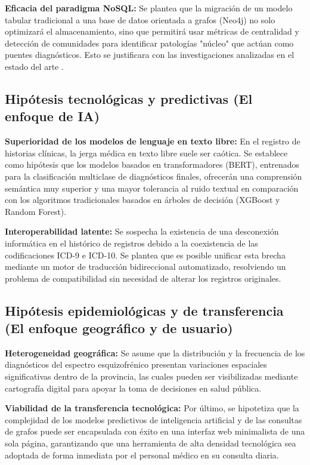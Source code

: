 \documentclass[12pt,a4paper,onecolumn,oneside]{report}
\begin{document}
    \textbf{Eficacia del paradigma NoSQL:} Se plantea que la migración de un modelo tabular tradicional a una base de datos orientada a grafos (Neo4j) no solo optimizará el almacenamiento, sino que permitirá usar métricas de centralidad y detección de comunidades para identificar patologías "núcleo" que actúan como puentes diagnósticos. Esto se justificara con las investigaciones analizadas en el estado del arte \cite{hidalgo2009dynamic}.

\subsection{Hipótesis tecnológicas y predictivas (El enfoque de IA)}

    \textbf{Superioridad de los modelos de lenguaje en texto libre:} En el registro de historias clínicas, la jerga médica en texto libre suele ser caótica. Se establece como hipótesis que los modelos basados en transformadores (BERT), entrenados para la clasificación multiclase de diagnósticos finales, ofrecerán una comprensión semántica muy superior y una mayor tolerancia al ruido textual en comparación con los algoritmos tradicionales basados en árboles de decisión (XGBoost y Random Forest).

    \textbf{Interoperabilidad latente:} Se sospecha la existencia de una desconexión informática en el histórico de registros debido a la coexistencia de las codificaciones ICD-9 e ICD-10. Se plantea que es posible unificar esta brecha mediante un motor de traducción bidireccional automatizado, resolviendo un problema de compatibilidad sin necesidad de alterar los registros originales.

\subsection{Hipótesis epidemiológicas y de transferencia (El enfoque geográfico y de usuario)}
    \textbf{Heterogeneidad geográfica:} Se asume que la distribución y la frecuencia de los diagnósticos del espectro esquizofrénico presentan variaciones espaciales significativas dentro de la provincia, las cuales pueden ser visibilizadas mediante cartografía digital para apoyar la toma de decisiones en salud pública.

    \textbf{Viabilidad de la transferencia tecnológica:} Por último, se hipotetiza que la complejidad de los modelos predictivos de inteligencia artificial y de las consultas de grafos puede ser encapsulada con éxito en una interfaz web minimalista de una sola página, garantizando que una herramienta de alta densidad tecnológica sea adoptada de forma inmediata por el personal médico en su consulta diaria.
\end{document}
